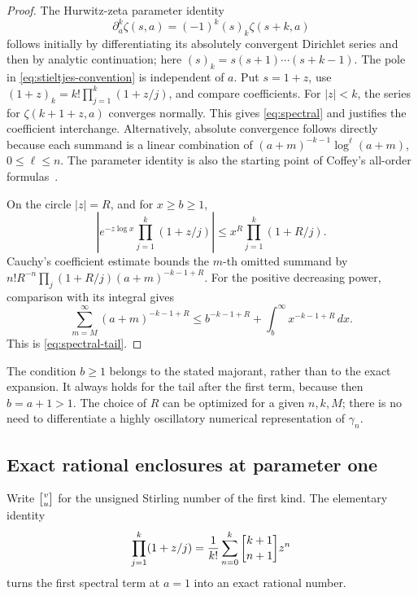 \begin{proof}
The Hurwitz-zeta parameter identity
\[
\partial_a^k\zeta(s,a)=(-1)^k(s)_k\zeta(s+k,a)
\]
follows initially by differentiating its absolutely convergent
Dirichlet series and then by analytic continuation; here
\((s)_k=s(s+1)\cdots(s+k-1)\).
The pole in \eqref{eq:stieltjes-convention} is independent of \(a\).
Put \(s=1+z\), use
\((1+z)_k=k!\prod_{j=1}^k(1+z/j)\), and compare coefficients.
For \(|z|<k\), the series for \(\zeta(k+1+z,a)\) converges normally.
This gives \eqref{eq:spectral} and justifies the coefficient
interchange. Alternatively, absolute convergence follows directly
because each summand is a linear combination of
\((a+m)^{-k-1}\log^\ell(a+m)\), \(0\le\ell\le n\).
The parameter identity is also the starting point of
Coffey's all-order formulas~\cite{Coffey}.

On the circle \(|z|=R\), and for \(x\ge b\ge1\),
\[
\left|e^{-z\log x}\prod_{j=1}^k(1+z/j)\right|
\le x^R\prod_{j=1}^k(1+R/j).
\]
Cauchy's coefficient estimate bounds the \(m\)-th omitted summand
by \(n!R^{-n}\prod_j(1+R/j)(a+m)^{-k-1+R}\).
For the positive decreasing power, comparison with its integral gives
\[
\sum_{m=M}^{\infty}(a+m)^{-k-1+R}
\le b^{-k-1+R}+\int_b^\infty x^{-k-1+R}\,dx.
\]
This is \eqref{eq:spectral-tail}.
\end{proof}

The condition \(b\ge1\) belongs to the stated majorant, rather than to
the exact expansion. It always holds for the tail after the first
term, because then \(b=a+1>1\). The choice of \(R\) can be optimized
for a given \(n,k,M\); there is no need to differentiate a
highly oscillatory numerical representation of \(\gamma_n\).

\subsection{Exact rational enclosures at parameter one}

Write \(\stirling{v}{u}\) for the unsigned Stirling number of the
first kind. The elementary identity
\begin{equation}\label{eq:stirling-product}
\prod_{j=1}^k(1+z/j)
 =\frac1{k!}\sum_{n=0}^k\stirling{k+1}{n+1}z^n
\end{equation}
turns the first spectral term at \(a=1\) into an exact rational
number.

